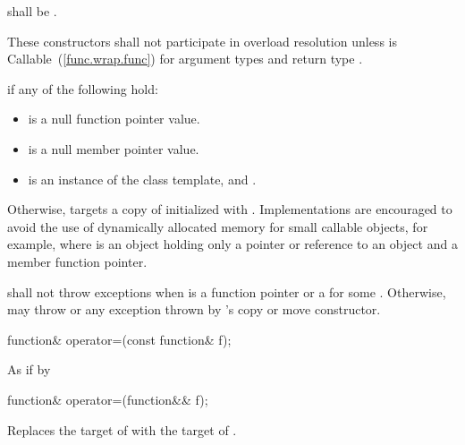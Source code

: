 \begin{itemdescr}
\pnum
\requires {} shall be .

\pnum
\remarks These constructors shall not participate in overload resolution unless
 is Callable~(\ref{func.wrap.func}) for argument types
 and return type .

\pnum
\postconditions {} if any of the following hold:
\begin{itemize}
\item {} is a null function pointer value.
\item {} is a null member pointer value.
\item {} is an instance of the  class template, and
  .
\end{itemize}

\pnum
Otherwise,  targets a copy of 
initialized with .
\enternote Implementations are encouraged to avoid the use of
dynamically allocated memory for small callable objects, for example,
where  is an object holding only a pointer or
reference to an object and a member function pointer. \exitnote

\pnum
\throws shall not throw exceptions when  is a function pointer
or a  for some . Otherwise,
may throw  or any exception thrown by 's copy
or move constructor.
\end{itemdescr}

%
%
\begin{itemdecl}
function& operator=(const function& f);
\end{itemdecl}

\begin{itemdescr}
\pnum
\effects As if by 

\pnum
\returns {}
\end{itemdescr}

%
%
\begin{itemdecl}
function& operator=(function&& f);
\end{itemdecl}

\begin{itemdescr}
\pnum
\effects Replaces the target of 
with the target of .

\pnum
\returns {}
\end{itemdescr}

